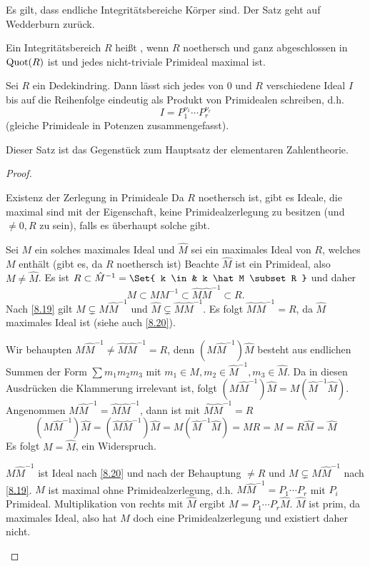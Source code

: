 \begin{nt*}
	Es gilt, dass endliche Integritätsbereiche Körper sind.
	Der Satz geht auf Wedderburn zurück. %
\end{nt*}

\begin{df} \label{8.16}
	Ein Integritätsbereich $R$ heißt , wenn $R$ noethersch und ganz abgeschlossen in $\operatorname{Quot}(R)$ ist und jedes nicht-triviale Primideal maximal ist.
\end{df}

\begin{st} \label{8.17}
	Sei $R$ ein Dedekindring.
	Dann lässt sich jedes von $0$ und $R$ verschiedene Ideal $I$ bis auf die Reihenfolge eindeutig als Produkt von Primidealen schreiben, d.h.
	\[
		I = P_1^{\nu_1} \dotsb P_r^{\nu_r}
	\]
	(gleiche Primideale in Potenzen zusammengefasst).
	\begin{note}
		Dieser Satz ist das Gegenstück zum Hauptsatz der elementaren Zahlentheorie.
	\end{note}
	\begin{proof}
		\begin{seg}{Existenz der Zerlegung in Primideale}
			Da $R$ noethersch ist, gibt es Ideale, die maximal sind mit der Eigenschaft, keine Primidealzerlegung zu besitzen (und $\neq 0, R$ zu sein), falls es überhaupt solche gibt.

			Sei $M$ ein solches maximales Ideal und $\hat M$ sei ein maximales Ideal von $R$, welches $M$ enthält (gibt es, da $R$ noethersch ist)
			Beachte $\hat M$ ist ein Primideal, also $M \neq \hat M$.
			Es ist $R \subset \hat M^{-1} = \Set{ k \in  & k \hat M \subset R }$ und daher
			\[
				M \subset M M^{-1} \subset \hat M \hat M^{-1} \subset R.
			\]
			Nach \ref{8.19} gilt $M \subsetneq M \hat M^{-1}$ und $\hat M \subsetneq \hat M \hat M^{-1}$.
			Es folgt $\hat M \hat M^{-1} = R$, da $\hat M$ maximales Ideal ist (siehe auch \ref{8.20}).

			Wir behaupten $M \hat M^{-1} \neq \hat M \hat M^{-1} = R$, denn
			$(M \hat M^{-1}) \hat M$ besteht aus endlichen Summen der Form $\sum m_1 m_2 m_3$ mit $m_1 \in M, m_2 \in \hat M^{-1}, m_3 \in \hat M$.
			Da in diesen Ausdrücken die Klammerung irrelevant ist, folgt $(M \hat M^{-1}) \hat M = M (\hat M^{-1} \hat M)$.
			Angenommen $M \hat M^{-1} = \hat M \hat M^{-1}$, dann ist mit $\hat M \hat M^{-1} = R$
			\[
				(M \hat M^{-1}) \hat M
				= (\hat M \hat M^{-1}) \hat M
				= M (\hat M^{-1} \hat M)
				= M R
				= M
				= R \hat M
				= \hat M
			\]
			Es folgt $M = \hat M$, ein Widerspruch.

			$M \hat M^{-1}$ ist Ideal nach \ref{8.20} und nach der Behauptung $\neq R$ und $M \subsetneq M \hat M^{-1}$ nach \ref{8.19}.
			$M$ ist maximal ohne Primidealzerlegung, d.h. $M \hat M^{-1} = P_1 \dotsb P_r$ mit $P_i$ Primideal.
			Multiplikation von rechts mit $\hat M$ ergibt $M = P_1 \dotsb P_r \hat M$.
			$\hat M$ ist prim, da maximales Ideal, also hat $M$ doch eine Primidealzerlegung und existiert daher nicht.
		\end{seg}
	\end{proof}
\end{st}

